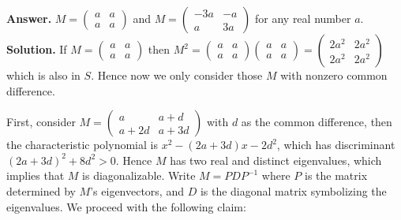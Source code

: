 \documentclass[11pt,a4paper]{article}
\newcommand{\<}{\langle}
\renewcommand{\>}{\rangle}
\begin{document}
\begin{enumerate}
	\textbf{Answer.} $M=\begin{pmatrix}a&a\\a&a\end{pmatrix}$ and $M=\begin{pmatrix}-3a&-a\\a&3a\end{pmatrix}$ for any real number $a$. \\
	\textbf{Solution.} If $M=\begin{pmatrix}a&a\\a&a\end{pmatrix}$ then $M^2=\begin{pmatrix}a&a\\a&a\end{pmatrix}
	\begin{pmatrix}a&a\\a&a\end{pmatrix}
	=\begin{pmatrix}2a^2&2a^2\\2a^2&2a^2\end{pmatrix}
	$
	which is also in $S$. Hence now we only consider those $M$ with nonzero common difference. 
	
	First, consider $M=\begin{pmatrix}a&a+d\\a+2d&a+3d\end{pmatrix}$ with $d$ as the common difference, then the characteristic polynomial is $x^2-(2a+3d)x-2d^2$, which has discriminant $(2a+3d)^2+8d^2>0$. Hence $M$ has two real and distinct eigenvalues, which implies that $M$ is diagonalizable. Write $M=PDP^{-1}$ where $P$ is the matrix determined by $M$'s eigenvectors, and $D$ is the diagonal matrix symbolizing the eigenvalues. We proceed with the following claim: 
	

\end{enumerate}
\end{document}
